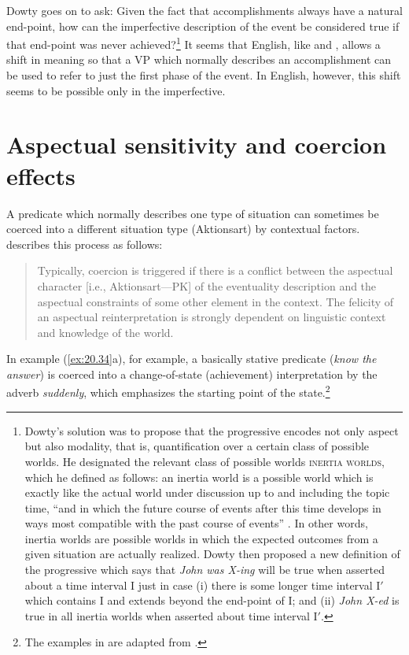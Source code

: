 Dowty goes on to ask: Given the fact that accomplishments always have a natural end-point, how can the imperfective description of the event be considered true if that end-point was never achieved?\footnote{Dowty’s solution was to propose that the progressive encodes not only aspect but also modality, that is, quantification over a certain class of possible worlds. He designated the relevant class of possible worlds \textsc{inertia worlds}, which he defined as follows: an inertia world is a possible world which is exactly like the actual world under discussion up to and including the topic time, “and in which the future course of events after this time develops in ways most compatible with the past course of events” \citep[148]{Dowty1979}. In other words, inertia worlds are possible worlds in which the expected outcomes from a given situation are actually realized. Dowty then proposed a new definition of the progressive which says that \textit{John was X-ing} will be true when asserted about a time interval I just in case (i) there is some longer time interval I$'$ which contains I and extends beyond the end-point of I; and (ii) \textit{John X-ed} is true in all inertia worlds when asserted about time interval I$'$.} It seems that English, like  and , allows a shift in meaning so that a VP which normally describes an accomplishment can be used to refer to just the first phase of the event. In English, however, this shift seems to be possible only in the imperfective.


\section{Aspectual sensitivity and coercion effects}\label{sec:20.6}

A predicate which normally describes one type of situation can sometimes be coerced into a different situation type (Aktionsart) by contextual factors.   describes this process as follows:


\begin{quote}
Typically, coercion is triggered if there is a conflict between the aspectual character [i.e., Aktionsart—PK] of the eventuality description and the aspectual constraints of some other element in the context. The felicity of an aspectual reinterpretation is strongly dependent on linguistic context and knowledge of the world.
\end{quote}


In example (\ref{ex:20.34}a), for example, a basically stative predicate (\textit{know the answer}) is coerced into a change-of-state (achievement) interpretation by the adverb \textit{suddenly}, which emphasizes the starting point of the state.\footnote{The examples in  are adapted from \citet[359]{deSwart1998}.}


